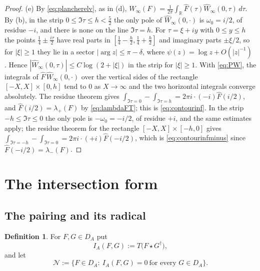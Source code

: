 \documentclass[11pt]{amsart}
\theoremstyle{definition}
\newtheorem{definition}[theorem]{Definition}
\theoremstyle{remark}
\newcommand{\R}{\mathbb R}
\newcommand{\Wh}{\widehat{W}}
\newcommand{\DA}{D_A}
\newcommand{\Nrad}{\mathcal N}
\begin{document}
\begin{proof}
(e)  By \eqref{eq:plancherelv}, as in (d),
$W_{\infty}(F)=\tfrac1{2\pi}\int_{\R}\widehat F(\tau)\Wh_{\infty}(0,\tau)\,d\tau$.
By (b), in the strip $0\le\Im\tau\le h<\tfrac52$ the only pole of
$\Wh_{\infty}(0,\cdot)$ is $\omega_0=i/2$, of residue $-i$, and there is none
on the line $\Im\tau=h$.  For $\tau=\xi+iy$ with $0\le y\le h$ the points
$\tfrac14\pm\tfrac{i\tau}2$ have real parts in
$[\tfrac14-\tfrac h2,\tfrac14+\tfrac h2]$ and imaginary parts $\pm\xi/2$,
so for $|\xi|\ge1$ they lie in a sector $|\arg z|\le\pi-\delta$, where
$\psi(z)=\log z+O(|z|^{-1})$ \cite[(5.11.2)]{DLMF}.  Hence
$|\Wh_{\infty}(0,\tau)|\le C\log(2+|\xi|)$ in the strip for $|\xi|\ge1$.
With \eqref{eq:PW}, the integrals of $\widehat F\,\Wh_{\infty}(0,\cdot)$ over
the vertical sides of the rectangle $[-X,X]\times[0,h]$ tend to $0$ as
$X\to\infty$ and the two horizontal integrals converge absolutely.  The
residue theorem gives
$\int_{\Im\tau=0}-\int_{\Im\tau=h}=2\pi i\cdot(-i)\widehat F(i/2)$, and
$\widehat F(i/2)=\lambda_+(F)$ by \eqref{eq:lambdaFT}; this is
\eqref{eq:contourinf}.  In the strip $-h\le\Im\tau\le0$ the only pole is
$-\omega_0=-i/2$, of residue $+i$, and the same estimates apply; the residue
theorem for the rectangle $[-X,X]\times[-h,0]$ gives
$\int_{\Im\tau=-h}-\int_{\Im\tau=0}=2\pi i\cdot(+i)\widehat F(-i/2)$, which is
\eqref{eq:contourinfminus} since $\widehat F(-i/2)=\lambda_-(F)$.
\end{proof}

\section{The intersection form}\label{sec:numerical}

\subsection{The pairing and its radical}

\begin{definition}\label{def:pairing}
For $F,G\in\DA$ put
\begin{equation}\label{eq:IA}
I_A(F,G):=T\bigl(F\star G^{\dagger}\bigr),
\end{equation}
and let
\begin{equation}\label{eq:radical}
\Nrad:=\bigl\{F\in\DA:\ I_A(F,G)=0\ \text{for every }G\in\DA\bigr\}.
\end{equation}
\end{definition}
\end{document}
